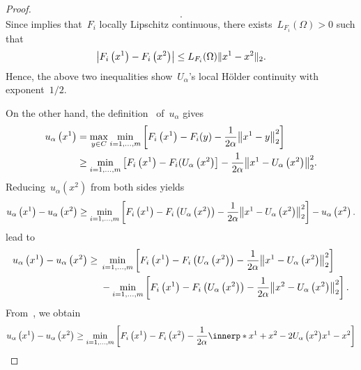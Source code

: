 \documentclass[../../main]{subfiles}
\begin{document}
\begin{proof}
\begin{equation}
        .\end{equation}
    Since  implies that~$F_i$ locally Lipschitz continuous, there exists~$L_{F_i}(\Omega) > 0$ such that
    \begin{equation} \label{eq:cont_u_alpha:local_Lipschitz}
        \abs*{F_i\left(x^1\right) - F_i\left(x^2\right)} \le L_{F_i}(\Omega) \norm{x^1 - x^2}_2
        .\end{equation}
    Hence, the above two inequalities show~$U_\alpha$'s local H\"older continuity with exponent~$1 / 2$.

    On the other hand, the definition~ of~$u_\alpha$ gives
    \begin{align}
        u_\alpha\left(x^1\right) & = \max_{y \in C} \min_{i = 1, \dots, m} \left[ F_i\left(x^1\right) - F_i(y) - \frac{1}{2 \alpha} \norm*{x^1 - y}_2^2 \right]                               \\
                                 & \ge \min_{i = 1, \dots, m} \left[F_i\left(x^1\right) - F_i(U_\alpha\left(x^2\right)\right] - \frac{1}{2 \alpha} \norm*{x^1 - U_\alpha\left(x^2\right)}_2^2
        .\end{align}
    Reducing~$u_\alpha\left(x^2\right)$ from both sides yields
    \begin{equation}
        u_\alpha\left(x^1\right) - u_\alpha\left(x^2\right) \ge \min_{i = 1, \dots, m} \left[F_i\left(x^1\right) - F_i\left(U_\alpha\left(x^2\right)\right) - \frac{1}{2 \alpha} \norm*{x^1 - U_\alpha\left(x^2\right)}_2^2\right] - u_\alpha\left(x^2\right)
        .\end{equation}
     lead to
    \begin{align}
        u_\alpha\left(x^1\right) - u_\alpha\left(x^2\right) \ge{} & \min_{i = 1, \dots, m} \left[F_i\left(x^1\right) - F_i\left(U_\alpha\left(x^2\right)\right) - \frac{1}{2 \alpha} \norm*{x^1 - U_\alpha\left(x^2\right)}_2^2\right]    \\
                                                                  & - \min_{i = 1, \dots, m} \left[F_i\left(x^1\right) - F_i\left(U_\alpha\left(x^2\right)\right) - \frac{1}{2 \alpha} \norm*{x^2 - U_\alpha\left(x^2\right)}_2^2 \right]
        .\end{align}
    From~, we obtain
    \begin{equation}
        u_\alpha\left(x^1\right) - u_\alpha\left(x^2\right) \ge \min_{i = 1, \dots, m} \left[ F_i\left(x^1\right) - F_i\left(x^2\right) - \frac{1}{2 \alpha} \innerp*{x^1 + x^2 - 2 U_\alpha\left(x^2\right)}{x^1 - x^2} \right]

\end{equation}
\end{proof}
\end{document}
